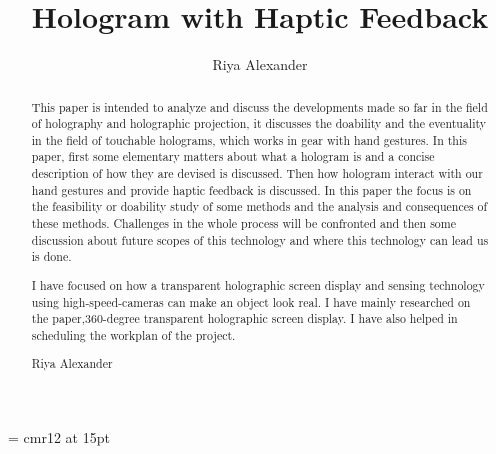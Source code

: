 \documentclass{fisatproject}
\title{Hologram with Haptic Feedback}
\author{Riya Alexander}
\begin{document}
\maketitle
\makecert
\font\secfont =  cmr12 at 15pt
\newpage
{}
\setcounter{page}{1}
\thispagestyle{plain}
\renewcommand\abstractname{ABSTRACT}
\begin{abstract}
\vspace{5cm}
This paper is intended to analyze and discuss the developments made so far in the field of holography and holographic projection, it discusses the doability and the eventuality in the field of touchable holograms, which works in gear with hand gestures. In this paper, first some elementary matters about what a hologram is and a concise description of how they are devised is discussed. Then how hologram interact with our hand gestures and provide haptic feedback is discussed. In this paper the focus is on the feasibility or doability study of some methods and the analysis and consequences of these methods. Challenges in the whole process will be confronted and then some discussion about future scopes of this technology and where this technology can lead us is done.
\end{abstract}



\newpage
\renewcommand\abstractname{Contribution by Author}
\thispagestyle{plain}
\begin{abstract}
\vspace{5cm}
I have focused on how a transparent holographic screen display and sensing technology using high-speed-cameras can make an object look real.
I have mainly researched on the paper,360-degree transparent holographic screen display.
I have also helped in scheduling the workplan of the project.
\vspace{1cm}
\begin{flushright}
Riya Alexander
\end{flushright}
\end{abstract}
\end{document}
